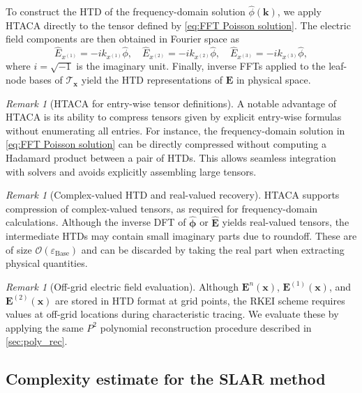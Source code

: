 \documentclass{article}
\theoremstyle{plain}
\theoremstyle{definition}
\theoremstyle{remark}
\newtheorem{remark}[theorem]{Remark}
\begin{document}
To construct the HTD of the frequency-domain solution $\widehat{\phi}(\bm{k})$, we apply HTACA directly to the tensor defined by \eqref{eq:FFT Poisson solution}. The electric field components are then obtained in Fourier space as
\[
\widehat{E}_{x^{(1)}} = -i k_{x^{(1)}} \widehat{\phi}, 
\quad 
\widehat{E}_{x^{(2)}} = -i k_{x^{(2)}} \widehat{\phi}, 
\quad 
\widehat{E}_{x^{(3)}} = -i k_{x^{(3)}} \widehat{\phi},
\]
where $i=\sqrt{-1}$ is the imaginary unit. Finally, inverse FFTs applied to the leaf-node bases of $\mathcal{T}_{\bm{x}}$ yield the HTD representations of $\bm{E}$ in physical space.

\begin{remark}[HTACA for entry-wise tensor definitions]
A notable advantage of HTACA is its ability to compress tensors given by explicit entry-wise formulas without enumerating all entries. For instance, the frequency-domain solution in \eqref{eq:FFT Poisson solution} can be directly compressed without computing a Hadamard product between a pair of HTDs. This allows seamless integration with solvers and avoids explicitly assembling large tensors.
\end{remark}

\begin{remark}[Complex-valued HTD and real-valued recovery]
HTACA supports compression of complex-valued tensors, as required for frequency-domain calculations.  
Although the inverse DFT of $\widehat{\bm{\phi}}$ or $\widehat{\bm{E}}$ yields real-valued tensors, the intermediate HTDs may contain small imaginary parts due to roundoff.  
These are of size $\mathcal{O}(\varepsilon_{\text{Base}})$ and can be discarded by taking the real part when extracting physical quantities.
\end{remark}

\begin{remark}[Off-grid electric field evaluation]
Although $\bm{E}^n(\bm{x})$, $\bm{E}^{(1)}(\bm{x})$, and $\bm{E}^{(2)}(\bm{x})$ are stored in HTD format at grid points, the RKEI scheme requires values at off-grid locations during characteristic tracing.  
We evaluate these by applying the same $P^2$ polynomial reconstruction procedure described in \cref{sec:poly_rec}.
\end{remark}


\subsection{Complexity estimate for the SLAR method}\label{sec:SLAR_complexity}
\end{document}
